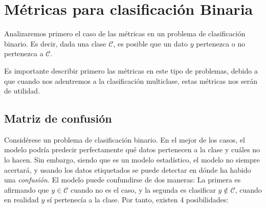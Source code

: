 \section{Métricas para clasificación Binaria}
Analizaremos primero el caso de las métricas en un problema de clasificación binario. Es decir, dada una clase $\mathcal C$, es posible que un dato $y$ pertenezca o no pertenezca a $\mathcal{C}$.

Es importante describir primero las métricas en este tipo de problemas, debido a que cuando nos adentremos a la clasificación multiclase, estas métricas nos serán de utilidad.
\subsection{Matriz de confusión}
Considérese un problema de clasificación binario. En el mejor de los casos, el modelo podría predecir perfectamente qué datos pertenecen a la clase y cuáles no lo hacen. Sin embargo, siendo que es un modelo estadístico, el modelo no siempre acertará, y usando los datos etiquetados se puede detectar en dónde ha habido una \textsl{confusión}. El modelo puede confundirse de dos maneras: La primera es afirmando que $y\in \mathcal C$ cuando no es el caso, y la segunda es clasificar  $y\notin \mathcal C$, cuando en realidad $y$ sí pertenecía a la clase. Por tanto, existen 4 posibilidades:

